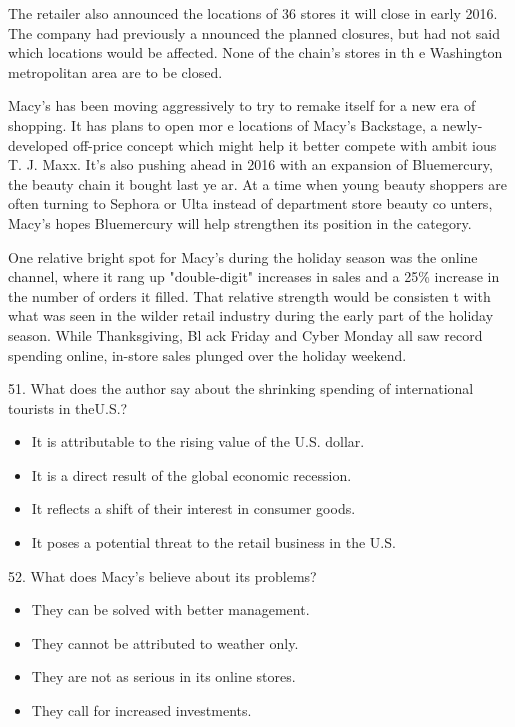 \documentclass[UTF8,11pt]{ctexart}
\begin{document}
The retailer also announced the locations of 36 stores it will close in early 2016. The company had previously a nnounced the planned closures, but had not said which locations would be affected. None of the chain's stores in th e Washington metropolitan area are to be closed.


Macy's has been moving aggressively to try to remake itself for a new era of shopping. It has plans to open mor e locations of Macy's Backstage, a newly-developed off-price concept which might help it better compete with ambit ious T. J. Maxx. It's also pushing ahead in 2016 with an expansion of Bluemercury, the beauty chain it bought last ye ar. At a time when young beauty shoppers are often turning to Sephora or Ulta instead of department store beauty co unters, Macy's hopes Bluemercury will help strengthen its position in the category.


One relative bright spot for Macy's during the holiday season was the online channel, where it rang up "double-digit" increases in sales and a 25\% increase in the number of orders it filled. That relative strength would be consisten t with what was seen in the wilder retail industry during the early part of the holiday season. While Thanksgiving, Bl ack Friday and Cyber Monday all saw record spending online, in-store sales plunged over the holiday weekend.


51. What does the author say about the shrinking spending of international tourists in theU.S.?


\begin{itemize}[leftmargin=2em,itemsep=.2em,topsep=.4em]\item[A.] It is attributable to the rising value of the U.S. dollar.
\item[B.] It is a direct result of the global economic recession.
\item[C.] It reflects a shift of their interest in consumer goods.
\item[D.] It poses a potential threat to the retail business in the U.S.
\end{itemize}

52. What does Macy's believe about its problems?


\begin{itemize}[leftmargin=2em,itemsep=.2em,topsep=.4em]\item[A.] They can be solved with better management.
\item[B.] They cannot be attributed to weather only.
\item[C.] They are not as serious in its online stores.
\item[D.] They call for increased investments.
\end{itemize}
\end{document}
